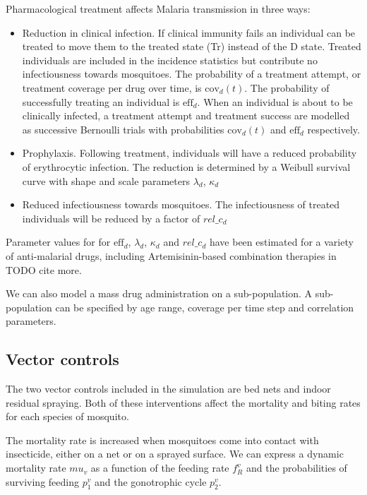 \documentclass{bmcart}
\begin{document}
Pharmacological treatment affects Malaria transmission in three ways:
\begin{itemize}
    \item Reduction in clinical infection. If clinical immunity fails an individual can be treated to move them to the treated state (Tr) instead of the D state. Treated individuals are included in the incidence statistics but contribute no infectiousness towards mosquitoes. The probability of a treatment attempt, or treatment coverage per drug over time, is $\text{cov}_d(t)$. The probability of successfully treating an individual is $\text{eff}_d$. When an individual is about to be clinically infected, a treatment attempt and treatment success are modelled as successive Bernoulli trials with probabilities $\text{cov}_d(t)$ and $\text{eff}_d$ respectively.
    \item Prophylaxis. Following treatment, individuals will have a reduced probability of erythrocytic infection. The reduction is determined by a Weibull survival curve with shape and scale parameters $\lambda_d$, $\kappa_d$
    \item Reduced infectiousness towards mosquitoes. The infectiousness of treated individuals will be reduced by a factor of $rel\_c_d$
\end{itemize}

Parameter values for for $\text{eff}_d$, $\lambda_d$, $\kappa_d$ and $rel\_c_d$ have been estimated for a variety of anti-malarial drugs, including Artemisinin-based combination therapies in \cite{okell_contrasting_2014} TODO cite more.

We can also model a mass drug administration on a sub-population. A sub-population can be specified by age range, coverage per time step and correlation parameters.

\subsection*{Vector controls}

The two vector controls included in the simulation are bed nets and indoor residual spraying. Both of these interventions affect the mortality and biting rates for each species of mosquito.

The mortality rate is increased when mosquitoes come into contact with insecticide, either on a net or on a sprayed surface. We can express a dynamic mortality rate $mu_v$ as a function of the feeding rate $f^v_R$ and the probabilities of surviving feeding $p^v_1$ and the gonotrophic cycle $p^v_2$.
\end{document}

